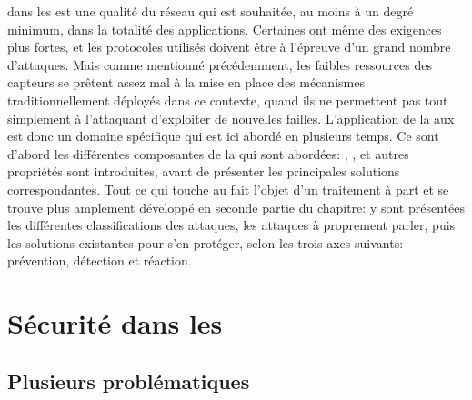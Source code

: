 \vfil
{} dans les \rcsfs est une qualité du réseau qui est souhaitée, au moins à un degré minimum, dans la totalité des applications.
Certaines ont même des exigences plus fortes, et les protocoles utilisés doivent être à l'épreuve d'un grand nombre d'attaques.
Mais comme mentionné précédemment, les faibles ressources des capteurs se prêtent assez mal à la mise en place des mécanismes traditionnellement déployés dans ce contexte, quand ils ne permettent pas tout simplement à l'attaquant d'exploiter de nouvelles failles.
L'application de la \secu aux \rcs est donc un domaine spécifique qui est ici abordé en plusieurs temps.
Ce sont d'abord les différentes composantes de la \secu qui sont abordées: , , \integrite et autres propriétés sont introduites, avant de présenter les principales solutions correspondantes.
Tout ce qui touche au \dds fait l'objet d'un traitement à part et se trouve plus amplement développé en seconde partie du chapitre: y sont présentées les différentes classifications des attaques, les attaques à proprement parler, puis les solutions existantes pour s'en protéger, selon les trois axes suivants: prévention, détection et réaction.
\vfil

\section{Sécurité dans les \rcs}\label{ea:sec:secu}

\subsection{Plusieurs problématiques}

